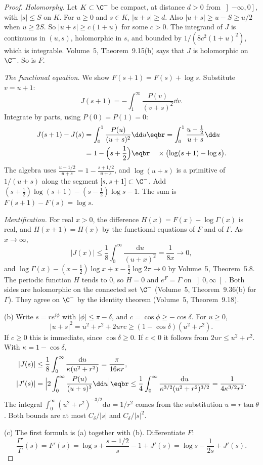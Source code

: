 \begin{proof}
\emph{Holomorphy.} Let $K\subset\C^-$ be compact, at distance $d>0$ from $\left]-\infty,0\right]$, with $|s|\le S$ on $K$. For $u\ge0$ and $s\in K$, $|u+s|\ge d$. Also $|u+s|\ge u-S\ge u/2$ when $u\ge2S$. So $|u+s|\ge c(1+u)$ for some $c>0$. The integrand of $J$ is continuous in $(u,s)$, holomorphic in $s$, and bounded by $1/(8c^2(1+u)^2)$, which is integrable. Volume~5, Theorem~9.15(b) says that $J$ is holomorphic on $\C^-$. So is $F$.

\emph{The functional equation.} We show $F(s+1)=F(s)+\log s$. Substitute $v=u+1$:
\[
J(s+1)=-\int_1^\infty\frac{P(v)}{(v+s)^2}\dd v.
\]
Integrate by parts, using $P(0)=P(1)=0$:
\[
\begin{aligned}J(s+1)-J(s)&=\int_0^1\frac{P(u)}{(u+s)^2}\dd u\eqbr=\int_0^1\frac{u-\frac12}{u+s}\dd u\\&=1-\Bigl(s+\frac12\Bigr)\eqbr\quad\times\bigl(\log(s+1)-\log s\bigr).\end{aligned}
\]
The algebra uses $\frac{u-1/2}{u+s}=1-\frac{s+1/2}{u+s}$, and $\log(u+s)$ is a primitive of $1/(u+s)$ along the segment $[s,s+1]\subset\C^-$. Add $(s+\frac12)\log(s+1)-(s-\frac12)\log s-1$. The sum is $F(s+1)-F(s)=\log s$.

\emph{Identification.} For real $x>0$, the difference $H(x)=F(x)-\log\Gamma(x)$ is real, and $H(x+1)=H(x)$ by the functional equations of $F$ and of $\Gamma$. As $x\to\infty$,
\[
|J(x)|\le\frac18\int_0^\infty\frac{\mathrm du}{(u+x)^2}=\frac1{8x}\to0,
\]
and $\log\Gamma(x)-(x-\frac12)\log x+x-\frac12\log2\pi\to0$ by Volume~5, Theorem~5.8. The periodic function $H$ tends to $0$, so $H=0$ and $e^F=\Gamma$ on $\left]0,\infty\right[$. Both sides are holomorphic on the connected set $\C^-$ (Volume~5, Theorem~9.36(b) for $\Gamma$). They agree on $\C^-$ by the identity theorem (Volume~5, Theorem~9.18).

(b) Write $s=re^{i\phi}$ with $|\phi|\le\pi-\delta$, and $c=\cos\phi\ge-\cos\delta$. For $u\ge0$,
\[
|u+s|^2=u^2+r^2+2urc\ge(1-\cos\delta)(u^2+r^2).
\]
If $c\ge0$ this is immediate, since $\cos\delta\ge0$. If $c<0$ it follows from $2ur\le u^2+r^2$. With $\kappa=1-\cos\delta$,
\[
\begin{aligned}|J(s)|&\le\frac18\int_0^\infty\frac{\mathrm du}{\kappa(u^2+r^2)}=\frac\pi{16\kappa r},\\|J'(s)|&=\Bigl|2\int_0^\infty\frac{P(u)}{(u+s)^3}\dd u\Bigr|\eqbr\le\frac14\int_0^\infty\frac{\mathrm du}{\kappa^{3/2}(u^2+r^2)^{3/2}}=\frac1{4\kappa^{3/2}r^2}.\end{aligned}
\]
The integral $\int_0^\infty(u^2+r^2)^{-3/2}\mathrm du=1/r^2$ comes from the substitution $u=r\tan\theta$. Both bounds are at most $C_\delta/|s|$ and $C_\delta/|s|^2$.

(c) The first formula is (a) together with (b). Differentiate $F$:
\[
\frac{\Gamma'}{\Gamma}(s)=F'(s)=\log s+\frac{s-1/2}s-1+J'(s)=\log s-\frac1{2s}+J'(s).
\]
\end{proof}

